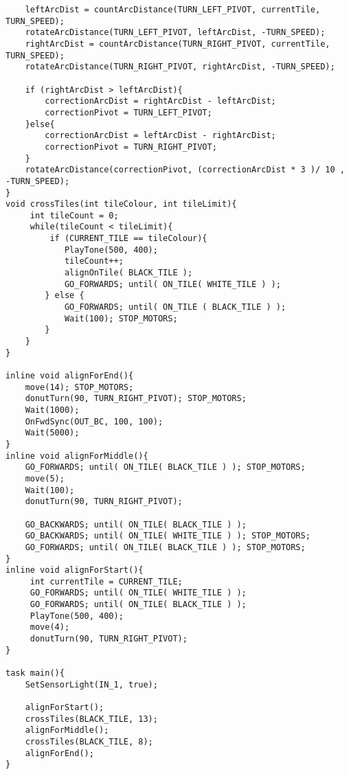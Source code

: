 \documentclass[a4paper,11pt]{article}
\begin{document}
\begin{lstlisting}
    leftArcDist = countArcDistance(TURN_LEFT_PIVOT, currentTile, TURN_SPEED);
    rotateArcDistance(TURN_LEFT_PIVOT, leftArcDist, -TURN_SPEED);
    rightArcDist = countArcDistance(TURN_RIGHT_PIVOT, currentTile, TURN_SPEED);
    rotateArcDistance(TURN_RIGHT_PIVOT, rightArcDist, -TURN_SPEED);

    if (rightArcDist > leftArcDist){
        correctionArcDist = rightArcDist - leftArcDist;
        correctionPivot = TURN_LEFT_PIVOT;
    }else{
        correctionArcDist = leftArcDist - rightArcDist;
        correctionPivot = TURN_RIGHT_PIVOT;
    }
    rotateArcDistance(correctionPivot, (correctionArcDist * 3 )/ 10 , -TURN_SPEED);
}
void crossTiles(int tileColour, int tileLimit){
     int tileCount = 0;
     while(tileCount < tileLimit){
         if (CURRENT_TILE == tileColour){
            PlayTone(500, 400);
            tileCount++;
            alignOnTile( BLACK_TILE );
            GO_FORWARDS; until( ON_TILE( WHITE_TILE ) );
        } else {
            GO_FORWARDS; until( ON_TILE ( BLACK_TILE ) );
            Wait(100); STOP_MOTORS;
        }
    }
}

inline void alignForEnd(){
    move(14); STOP_MOTORS;
    donutTurn(90, TURN_RIGHT_PIVOT); STOP_MOTORS;
    Wait(1000);
    OnFwdSync(OUT_BC, 100, 100);
    Wait(5000);
}
inline void alignForMiddle(){
    GO_FORWARDS; until( ON_TILE( BLACK_TILE ) ); STOP_MOTORS;
    move(5);
    Wait(100);
    donutTurn(90, TURN_RIGHT_PIVOT);

    GO_BACKWARDS; until( ON_TILE( BLACK_TILE ) );
    GO_BACKWARDS; until( ON_TILE( WHITE_TILE ) ); STOP_MOTORS;
    GO_FORWARDS; until( ON_TILE( BLACK_TILE ) ); STOP_MOTORS;
}
inline void alignForStart(){
     int currentTile = CURRENT_TILE;
     GO_FORWARDS; until( ON_TILE( WHITE_TILE ) );
     GO_FORWARDS; until( ON_TILE( BLACK_TILE ) );
     PlayTone(500, 400);
     move(4);
     donutTurn(90, TURN_RIGHT_PIVOT);
}

task main(){
    SetSensorLight(IN_1, true);

    alignForStart();
    crossTiles(BLACK_TILE, 13);
    alignForMiddle();
    crossTiles(BLACK_TILE, 8);
    alignForEnd();
}
\end{lstlisting}
\end{document}
